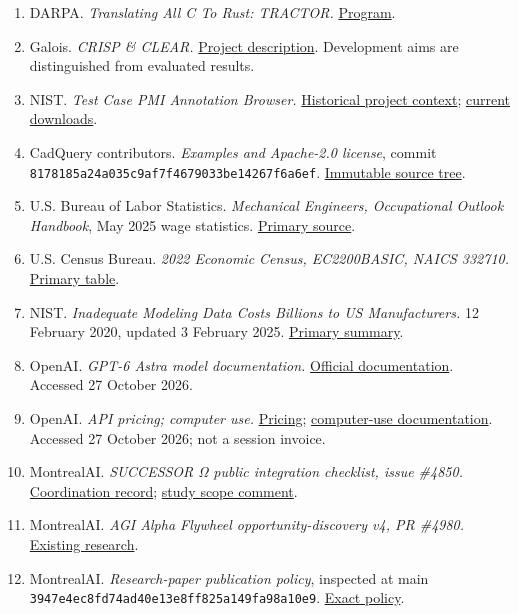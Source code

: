 \documentclass[11pt,letterpaper]{article}
\begin{document}
\begin{enumerate}
\item
  DARPA. \emph{Translating All C To Rust: TRACTOR.} \href{https://www.darpa.mil/research/programs/translating-all-c-to-rust}{Program}.
\item
  Galois. \emph{CRISP \& CLEAR.} \href{https://www.galois.com/project/crisp-clear}{Project description}. Development aims are distinguished from evaluated results.
\item
  NIST. \emph{Test Case PMI Annotation Browser.} \href{https://pages.nist.gov/CAD-PMI-Testing/models.html}{Historical project context}; \href{https://www.nist.gov/ctl/smart-connected-systems-division/smart-connected-manufacturing-systems-group/mbe-pmi-0}{current downloads}.
\item
  CadQuery contributors. \emph{Examples and Apache-2.0 license}, commit \nolinkurl{8178185a24a035c9af7f4679033be14267f6a6ef}. \href{https://github.com/CadQuery/cadquery/tree/8178185a24a035c9af7f4679033be14267f6a6ef/examples}{Immutable source tree}.
\item
  U.S. Bureau of Labor Statistics. \emph{Mechanical Engineers, Occupational Outlook Handbook}, May 2025 wage statistics. \href{https://www.bls.gov/ooh/architecture-and-engineering/mechanical-engineers.htm}{Primary source}.
\item
  U.S. Census Bureau. \emph{2022 Economic Census, EC2200BASIC, NAICS 332710.} \href{https://data.census.gov/table/ECNBASIC2022.EC2200BASIC?q=332710}{Primary table}.
\item
  NIST. \emph{Inadequate Modeling Data Costs Billions to US Manufacturers.} 12 February 2020, updated 3 February 2025. \href{https://www.nist.gov/news-events/news/2020/02/inadequate-modeling-data-costs-billions-us-manufacturers}{Primary summary}.
\item
  OpenAI. \emph{GPT-6 Astra model documentation.} \href{https://developers.openai.com/api/docs/models/gpt-6-astra}{Official documentation}. Accessed 27 October 2026.
\item
  OpenAI. \emph{API pricing; computer use.} \href{https://developers.openai.com/api/docs/pricing}{Pricing}; \href{https://developers.openai.com/api/docs/guides/tools-computer-use}{computer-use documentation}. Accessed 27 October 2026; not a session invoice.
\item
  MontrealAI. \emph{SUCCESSOR Ω public integration checklist, issue \#4850.} \href{https://github.com/MontrealAI/AGI-Alpha-Agent-v0/issues/4850}{Coordination record}; \href{https://github.com/MontrealAI/AGI-Alpha-Agent-v0/issues/4850\#issuecomment-6458290271}{study scope comment}.
\item
  MontrealAI. \emph{AGI Alpha Flywheel opportunity-discovery v4, PR \#4980.} \href{https://github.com/MontrealAI/AGI-Alpha-Agent-v0/pull/4980}{Existing research}.
\item
  MontrealAI. \emph{Research-paper publication policy}, inspected at main \nolinkurl{3947e4ec8fd74ad40e13e8ff825a149fa98a10e9}. \href{https://github.com/MontrealAI/AGI-Alpha-Agent-v0/blob/3947e4ec8fd74ad40e13e8ff825a149fa98a10e9/docs/agent/PAPER_UPLOADS.md}{Exact policy}.
\end{enumerate}
\end{document}
